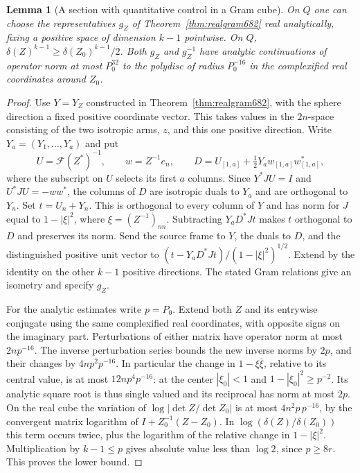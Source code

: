 \documentclass[a4paper,11pt]{article}
\newtheorem{lemma}[proposition]{Lemma}
\theoremstyle{definition}
\theoremstyle{remark}
\numberwithin{equation}{section}
\begin{document}
\begin{lemma}[A section with quantitative control in a Gram cube]
\leavevmode\label{lem:gramchart683}
On \(Q\) one can choose the representatives \(g_Z\) of
Theorem~\ref{thm:realgram682} real analytically, fixing a positive
space of dimension \(k-1\) pointwise. On \(Q\),
\(\delta(Z)^{k-1}\ge\delta(Z_0)^{k-1}/2\).
Both \(g_Z\) and \(g_Z^{-1}\) have analytic continuations of
operator norm at most \(P_0^{32}\) to the polydisc of radius
\(P_0^{-16}\) in the complexified real coordinates around \(Z_0\).
\end{lemma}
\begin{proof}
Use \(Y=Y_Z\) constructed in Theorem~\ref{thm:realgram682},
with the sphere direction a fixed positive coordinate vector.
This takes values in the \(2n\)-space consisting of the two
isotropic arms, \(z\), and this one positive direction. Write
\(Y_a=(Y_1,\ldots,Y_a)\) and put
\[
 U=\mathcal F(Z^*)^{-1},\qquad w=Z^{-1}e_n,\qquad
 D=U_{[1,a]}+\tfrac12Y_a w_{[1,a]}w_{[1,a]}^* ,
\]
where the subscript on \(U\) selects its first \(a\) columns.
Since \(Y^*JU=I\) and \(U^*JU=-ww^*\), the columns of \(D\)
are isotropic duals to \(Y_a\) and are orthogonal to \(Y_n\).
Set \(t=U_n+Y_n\). This is orthogonal to every column of \(Y\)
and has norm for \(J\) equal to \(1-|\xi|^2\), where
\(\xi=(Z^{-1})_{nn}\). Subtracting \(Y_a D^*Jt\) makes \(t\)
orthogonal to \(D\) and preserves its norm. Send the source frame
to \(Y\), the duals to \(D\), and the distinguished positive
unit vector to \((t-Y_aD^*Jt)/(1-|\xi|^2)^{1/2}\). Extend by the
identity on the other \(k-1\) positive directions. The stated
Gram relations give an isometry and specify \(g_Z\).

For the analytic estimates write \(p=P_0\). Extend both \(Z\)
and its entrywise conjugate using the same complexified real
coordinates, with opposite signs on the imaginary part.
Perturbations of either matrix have operator norm at most
\(2np^{-16}\). The inverse perturbation series bounds the new
inverse norms by \(2p\), and their changes by \(4np^2p^{-16}\).
In particular the change in \(1-\xi\bar\xi\), relative to its
central value, is at most \(12np^4p^{-16}\): at the center
\(|\xi_0|<1\) and \(1-|\xi_0|^2\ge p^{-2}\). Its analytic square
root is thus single valued and its reciprocal has norm at most
\(2p\). On the real cube the variation of
\(\log|\det Z/\det Z_0|\) is at most \(4n^2p\,p^{-16}\), by
the convergent matrix logarithm of \(I+Z_0^{-1}(Z-Z_0)\).
In \(\log(\delta(Z)/\delta(Z_0))\) this term occurs twice, plus
the logarithm of the relative change in \(1-|\xi|^2\).
Multiplication by \(k-1\le p\) gives absolute value less than
\(\log 2\), since \(p\ge8r\). This proves the lower bound.


\end{proof}
\end{document}
